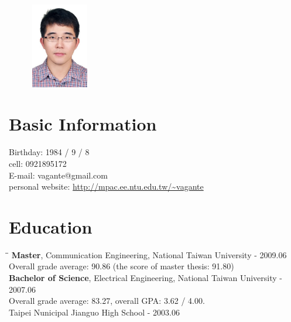\documentclass{res}
\begin{document}
 
\begin{CJK}{UTF8}{bsmi}

\begin{resume}

\begin{figure}
	\vspace{-1in}
		\includegraphics[width=25mm]{head.jpg}
\end{figure}

\section{Basic Information}
	Birthday: 1984 / 9 / 8  \\
	cell: 0921895172 \\
	E-mail: vagante@gmail.com \\
	personal website: \url{http://mpac.ee.ntu.edu.tw/~vagante}\\

\section{Education}
	\vspace{-0.1in}
	\begin{tabbing}
	\hspace{0.3in}\= \hspace{4.6in}\= \kill
	\textbf{Master}, Communication Engineering, National Taiwan University \> - 2009.06 \\
		\>Overall grade average: 90.86 (the score of master thesis: 91.80)\\	
	\textbf{Bachelor of Science}, Electrical Engineering, National Taiwan University  \> - 2007.06 \\
		\>Overall grade average: 83.27, overall GPA: 3.62 / 4.00. \\
    Taipei Nunicipal Jianguo High School                     \> - 2003.06 \\
	\end{tabbing}\vspace{-20pt}


\end{resume}
\end{CJK}
\end{document}
